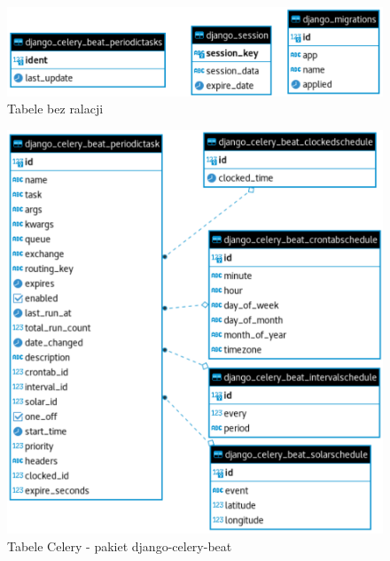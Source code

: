 \documentclass[11pt,a4paper]{article}
\begin{document}
    \begin{figure}[!h]
        \begin{center}
            \includegraphics[width=\textwidth]{images/other_tables.pdf}
        \end{center}
        \caption{Tabele bez ralacji}
    \end{figure}
    \newpage
    \begin{figure}[!h]
        \begin{center}
            \includegraphics[width=\textwidth]{images/celery_tables.pdf}
        \end{center}
        \caption{Tabele Celery - pakiet django-celery-beat}
    \end{figure}
\end{document}
